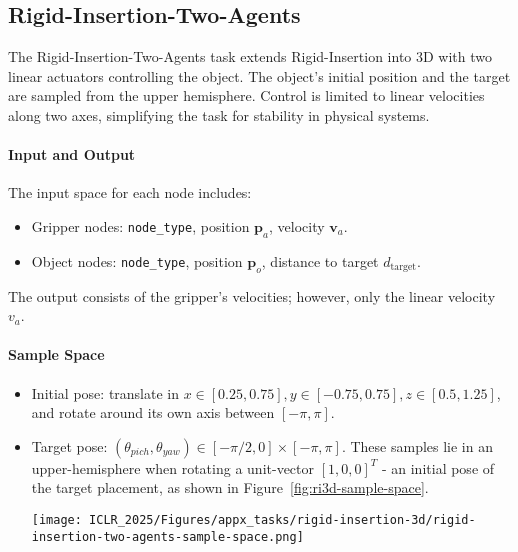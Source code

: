 \subsection{Rigid-Insertion-Two-Agents}
The Rigid-Insertion-Two-Agents task extends Rigid-Insertion into 3D with two linear actuators controlling the object. The object's initial position and the target are sampled from the upper hemisphere. Control is limited to linear velocities along two axes, simplifying the task for stability in physical systems.



\paragraph{Input and Output}
The input space for each node includes:
\begin{itemize}
    \item Gripper nodes: \texttt{node\_type}, position $\mathbf{p}_a$, velocity $\mathbf{v}_a$.
    \item Object nodes: \texttt{node\_type}, position $\mathbf{p}_o$, distance to target $d_{\text{target}}$.
\end{itemize}

The output consists of the gripper's velocities; however, only the linear velocity $v_a$. 

\paragraph{Sample Space}
\begin{itemize}
    \item Initial pose: translate in $x \in [0.25, 0.75], y \in [-0.75, 0.75], z \in [0.5, 1.25]$, and rotate around its own axis between $[-\pi, \pi]$.
    \item Target pose: $(\theta_{pich}, \theta_{yaw}) \in [-\pi / 2, 0] \times [-\pi, \pi]$. These samples lie in an upper-hemisphere when rotating a unit-vector $[1, 0, 0]^T$ - an initial pose of the target placement, as shown in Figure~\ref{fig:ri3d-sample-space}.
    \begin{figure*}[ht]
        \centering
        \texttt{[image: ICLR\_2025/Figures/appx\_tasks/rigid-insertion-3d/rigid-insertion-two-agents-sample-space.png]}
        \caption{Sample space of the Rigid-Insertion-Two-Agents task.}
    
        \label{fig:ri3d-sample-space}
    \end{figure*}
\end{itemize}

